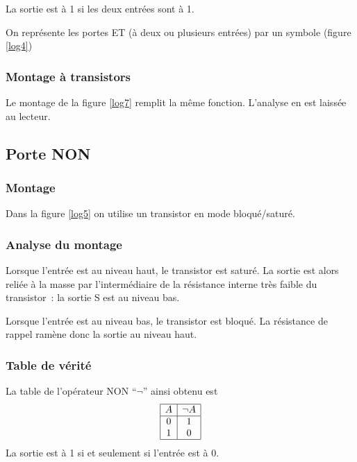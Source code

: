La sortie est \`a 1 si
les deux entr\'ees sont \`a 1.

On repr\'esente les portes ET (\`a deux ou plusieurs entr\'ees)
par un symbole (figure \ref{log4})


\subsubsection{Montage \`a transistors}

Le montage de la figure \ref{log7} remplit la m\^eme fonction. L'analyse
en est laiss\'ee au lecteur.



\subsection{Porte NON}

\subsubsection{Montage}

Dans la figure \ref{log5} on utilise un transistor en mode bloqu\'e/satur\'e.


\subsubsection{Analyse du montage}

Lorsque l'entr\'ee est au niveau haut, le transistor est saturé. La
sortie est alors reli\'ee \`a la masse par l'interm\'ediaire de la
r\'esistance interne tr\`es faible du transistor~: la sortie S est au
niveau bas.

Lorsque l'entr\'ee est au niveau bas, le transistor est bloqu\'e. La
r\'esistance de rappel ramène donc la sortie au niveau haut.

\subsubsection{Table de v\'erit\'e}

La table de l'op\'erateur NON ``$\neg$'' ainsi obtenu est
$$ \begin{array}{|c|c|}
\hline
A & \neg A \\
\hline
0& 1 \\
1& 0 \\
\hline
\end{array} $$
La sortie est \`a 1 si et seulement si l'entr\'ee est \`a 0.

